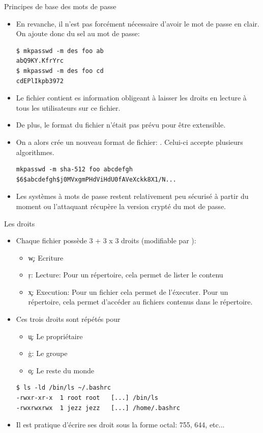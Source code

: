 \begin{frame}[fragile=singleslide]{Principes de base des mots de passe}
\begin{itemize} 
\item En revanche, il n'est  pas forcément nécessaire d'avoir le mot de
  passe en clair. On ajoute donc du sel au mot de passe:
\begin{lstlisting} 
$ mkpasswd -m des foo ab
abQ9KY.KfrYrc
$ mkpasswd -m des foo cd
cdEPlIkpb3972
\end{lstlisting} 
\item Le fichier   contient es information obligeant
  à  laisser les  droits en  lecture à  tous les  utilisateurs  sur ce
  fichier.
\item  De plus, le  format du  fichier   n'était pas
  prévu pour être extensible.
\item   On   a   alors    crée   un   nouveau   format   de   fichier:
  .  Celui-ci accepte plusieurs algorithmes.
\begin{lstlisting} 
mkpasswd -m sha-512 foo abcdefgh
$6$abcdefgh$j0MVxgmPHdViHdU0fAVeXckk8X1/N...
\end{lstlisting}
\item Les systèmes à mots de passe restent relativement peu sécurisé à
  partir du moment ou l'attaquant récupère la version crypté du mot de
  passe.
\end{itemize} 
\end{frame}

\begin{frame}[fragile=singleslide]{Les droits}
  \begin{itemize}
  \item  Chaque fichier  possède  3 +  3  x 3  droits (modifiable  par
    ):
    \begin{itemize}
    \item \c{w}: Ecriture
    \item \c{r}: Lecture: Pour un répertoire, cela permet de lister le contenu
    \item \c{x}: Execution: Pour un fichier cela permet de
      l'éxecuter. Pour un répertoire, cela permet d'accéder au
      fichiers contenus dans le répertoire.
    \end{itemize}
  \item Ces trois droits sont répétés pour
    \begin{itemize}
    \item \c{u}: Le propriétaire
    \item \c{g}: Le groupe
    \item \c{o}: Le reste du monde
    \end{itemize}
    \begin{lstlisting}[columns=fixed]
$ ls -ld /bin/ls ~/.bashrc
-rwxr-xr-x  1 root root   [...] /bin/ls
-rwxrwxrwx  1 jezz jezz   [...] /home/.bashrc
    \end{lstlisting}
  \item Il est  pratique d'écrire ses droit sous  la forme octal: 755,
    644, etc...
  \end{itemize}
\end{frame}


